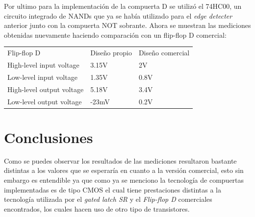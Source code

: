 Por ultimo para la implementación de la compuerta D se utilizó el 74HC00, un circuito integrado de NANDs que ya se había utilizado para el \textit{edge detecter} anterior junto con la compuerta NOT sobrante.
Ahora se muestran las mediciones obtenidas nuevamente haciendo comparación con un flip-flop D comercial:
\begin{center}
\begin{table}[]
	\begin{tabular}{lll}
	Flip-flop D               & Diseño propio & Diseño comercial \\
	High-level input voltage  & 3.15V         & 2V               \\
	Low-level input voltage   & 1.35V         & 0.8V             \\
	High-level output voltage & 5.18V         & 3.4V             \\
	Low-level output voltage  & -23mV         & 0.2V            
	\end{tabular}
\end{table}
\end{center}
\section{Conclusiones}
Como se puedes observar los resultados de las mediciones resultaron bastante distintas a los valores que se esperaría en cuanto a la versión comercial, esto sin embargo es entendible ya que como ya se menciono la tecnología de compuertas implementadas es de tipo CMOS el cual tiene prestaciones distintas a la tecnología utilizada por el \textit{gated latch SR} y el \textit{Flip-flop D} comerciales encontrados, los cuales hacen uso de otro tipo de transistores.